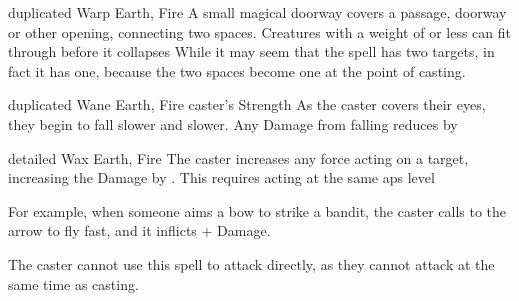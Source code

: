\ifodd\value{diceNo}

  {duplicated}%
  {Warp}%
  {Earth, Fire}%
  {}%
  {A small magical doorway covers a passage, doorway or other opening, connecting two spaces.
  Creatures with a \gls{weight} of  or less can fit through before it collapses}%
  {While it may seem that the spell has two targets, in fact it has one, because the two spaces become one at the point of casting.}

  {duplicated}%
  {Wane}%
  {Earth, Fire}%
  {caster's Strength}%
  {As the caster covers their eyes, they begin to fall slower and slower.
  Any Damage from falling reduces by }%
  {}

\else

  {detailed}%
  {Wax}%
  {Earth, Fire}%
  {}%
  {The caster increases any force acting on a target, increasing the Damage by .
  This requires acting at the same \glspl{ap} level}%
  {For example, when someone aims a bow to strike a bandit, the caster calls to the arrow to fly fast, and it inflicts + Damage.

    The caster cannot use this spell to attack directly, as they cannot attack at the same time as casting.}

\fi
